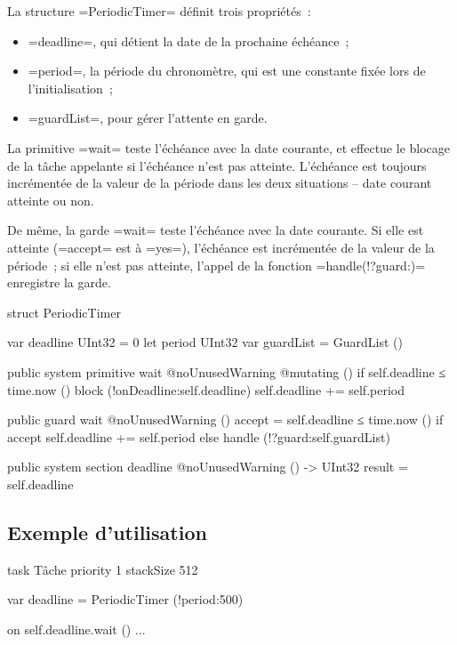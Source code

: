 La structure \plm=PeriodicTimer= définit trois propriétés~:
\begin{itemize}
  \item \plm=deadline=, qui détient la date de la prochaine échéance~;
  \item \plm=period=, la période du chronomètre, qui est une constante fixée lors de l'initialisation~;
  \item \plm=guardList=, pour gérer l'attente en garde.
\end{itemize}

La primitive \plm=wait= teste l'échéance avec la date courante, et effectue le blocage de la tâche appelante si l'échéance n'est pas atteinte. L'échéance est toujours incrémentée de la valeur de la période dans les deux situations -- date courant atteinte ou non.


De même, la garde \plm=wait= teste l'échéance avec la date courante. Si elle est atteinte (\plm=accept= est à \plm=yes=), l'échéance est incrémentée de la valeur de la période~; si elle n'est pas atteinte, l'appel de la fonction \plm=handle(!?guard:)= enregistre la garde.
\begin{PLM}
struct PeriodicTimer {
  var deadline UInt32 = 0
  let period UInt32
  var guardList = GuardList ()

  public system primitive wait @noUnusedWarning @mutating () {
    if self.deadline ≤ time.now () {
      block (!onDeadline:self.deadline)
    }
    self.deadline += self.period
  }

  public guard wait @noUnusedWarning () {
    accept = self.deadline ≤ time.now ()
    if accept {
      self.deadline += self.period
    }else{
      handle (!?guard:self.guardList)
    }
  }
  
  public system section deadline @noUnusedWarning () -> UInt32 {
    result = self.deadline
  }
}
\end{PLM}


\subsection{Exemple d'utilisation}

\begin{PLM}
task Tâche priority 1 stackSize 512 {
  var deadline = PeriodicTimer (!period:500)
   

  on self.deadline.wait () {
    ...
  }
}
\end{PLM}





